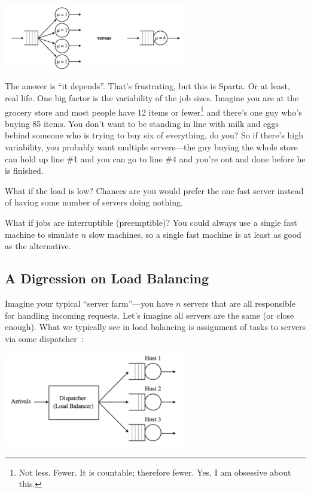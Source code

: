 \documentclass[a4paper]{report}
\begin{document}
\begin{center}
	\includegraphics[width=0.6\textwidth]{images/qt-example3.png}
\end{center}

The answer is ``it depends''. That's frustrating, but this is Sparta. Or at least, real life. One big factor is the variability of the job sizes. Imagine you are at the grocery store and most people have 12 items or fewer\footnote{Not less. Fewer. It is countable; therefore fewer. Yes, I am obsessive about this.} and there's one guy who's buying 85 items. You don't want to be standing in line with milk and eggs behind someone who is trying to buy six of everything, do you? So if there's high variability, you probably want multiple servers---the guy buying the whole store can hold up line \#1 and you can go to line \#4 and you're out and done before he is finished.

What if the load is low? Chances are you would prefer the one fast server instead of having some number of servers doing nothing.

What if jobs are interruptible (preemptible)? You could always use a single fast machine to simulate $n$ slow machines, so a single fast machine is at least as good as the alternative. 

\subsection*{A Digression on Load Balancing}

Imagine your typical ``server farm''---you have $n$ servers that are all responsible for handling incoming requests. Let's imagine all servers are the same (or close enough). What we typically see in load balancing is assignment of tasks to servers via some dispatcher~\cite{pmd}:

\begin{center}
	\includegraphics[width=0.6\textwidth]{images/central-dispatcher.png}
\end{center}
\end{document}
